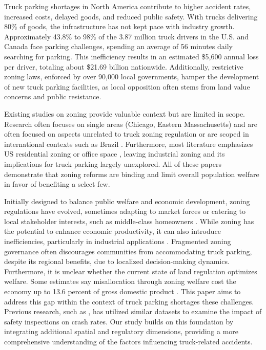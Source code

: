 \documentclass[
  12pt]{article}
\begin{document}
Truck parking shortages in North America contribute to higher accident
rates, increased costs, delayed goods, and reduced public safety. With
trucks delivering 80\% of goods, the infrastructure has not kept pace
with industry growth. Approximately 43.8\% to 98\% of the 3.87 million
truck drivers in the U.S. and Canada face parking challenges, spending
an average of 56 minutes daily searching for parking. This inefficiency
results in an estimated \$5,600 annual loss per driver, totaling about
\$21.69 billion nationwide. Additionally, restrictive zoning laws,
enforced by over 90,000 local governments, hamper the development of new
truck parking facilities, as local opposition often stems from land
value concerns and public resistance.

Existing studies on zoning provide valuable context but are limited in
scope. Research often focuses on single areas (Chicago, Eastern
Massachusetts) and are often focused on aspects unrelated to truck
zoning regulation
\citep{shertzerRaceEthnicityDiscriminatory2016, glaeserCausesConsequencesLand2009}
or are scoped in international contexts such as Brazil
\citep{anagolEstimatingEconomicValue2021}. Furthermore, most literature
emphasizes US residential zoning
\citep{lensStrictLandUse2016, huangResidentialLandUse2012}or office
space \citep{cheshireOfficeSpaceSupply2008}, leaving industrial zoning
and its implications for truck parking largely unexplored. All of these
papers demonstrate that zoning reforms are binding and limit overall
population welfare in favor of benefiting a select few.

Initially designed to balance public welfare and economic development,
zoning regulations have evolved, sometimes adapting to market forces or
catering to local stakeholder interests, such as middle-class homeowners
\citep{fischelEconomicHistoryZoning2024}. While zoning has the potential
to enhance economic productivity, it can also introduce inefficiencies,
particularly in industrial applications
\citep{mcdonaldPDFEconomicsZoning2012}. Fragmented zoning governance
often discourages communities from accommodating truck parking, despite
its regional benefits, due to localized decision-making dynamics.
Furthermore, it is unclear whether the current state of land regulation
optimizes welfare. Some estimates say misallocation through zoning
welfare cost the economy up to 13.6 percent of gross domestic product
\citep{osmanRestrictiveLandUse2020}. This paper aims to address this gap
within the context of truck parking shortages these challenges. Previous
research, such as \citet{liangSafetyInspectionsImprove2021}, has
utilized similar datasets to examine the impact of safety inspections on
crash rates. Our study builds on this foundation by integrating
additional spatial and regulatory dimensions, providing a more
comprehensive understanding of the factors influencing truck-related
accidents.
\end{document}
